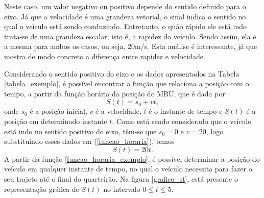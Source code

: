 \documentclass[
	12pt,				%
	openright,			%
    twoside,			%
	a4paper,			%
	chapter=TITLE,		%
	english,			%
	french,				%
	spanish,			%
	brazil				%
	]{abntex2}
\numberwithin{lema}{chapter}
\numberwithin{teorema}{chapter}
\numberwithin{definicao}{chapter}
\numberwithin{exemplo}{chapter}
\numberwithin{figure}{chapter}
\begin{document}
Neste caso, um valor negativo ou positivo depende do sentido definido para o eixo. Já que a velocidade é uma grandeza vetorial, o sinal indica o sentido no qual o veículo está sendo conduzindo. Entretanto, o quão rápido ele está indo trata-se de uma grandeza escalar, isto é, a rapidez do veículo. Sendo assim, ela é a mesma para ambos os casos, ou seja, 20m/s. Esta análise é interessante, já que mostra de modo concreto a diferença entre rapidez e velocidade.

Considerando o sentido positivo do eixo e os dados apresentados na Tabela \ref{tabela_exemplo}, é possível encontrar a função que relaciona a posição com o tempo, a partir da função horária da posição do MRU, que é dada por
\begin{equation}
	\label{funcao_horaria}
	S(t) = s_0 + vt,
\end{equation}
onde $s_0$ é a posição inicial, $v$ é a velocidade, $t$ é o instante de tempo e $S(t)$ é a posição em determinado instante $t$. Como está sendo considerado que o veículo está indo no sentido positivo do eixo, têm-se que $s_0 = 0$ e $v = 20$, logo substituindo esses dados em (\ref{funcao_horaria}), temos
\begin{equation}
	\label{funcao_horaria_exemplo}
	S(t) = 20t.
\end{equation}
A partir da função \ref{funcao_horaria_exemplo}, é possível determinar a posição do veículo em qualquer instante de tempo, no qual o veículo necessita para fazer o seu trajeto até o final do quarteirão. Na figura \ref{grafico_st}, está presente o representação gráfica de $S(t)$ no intervalo $0 \leq t \leq 5$.
\end{document}
